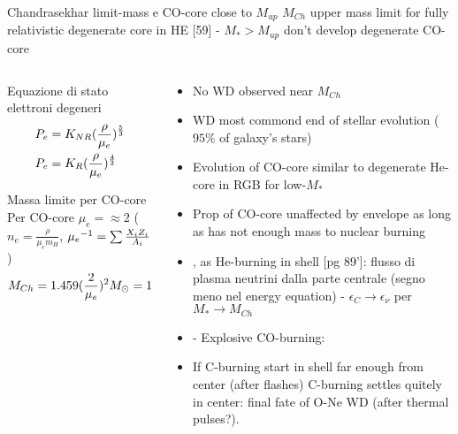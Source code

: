 \begin{frame}{Chandrasekhar limit-mass e CO-core close to $M_{up}$}
$M_{Ch}$ upper mass limit for fully relativistic degenerate core in HE [59] - $M_*>M_{up}$ don't develop degenerate CO-core
\begin{columns}[T]
\begin{column}{0.4\textwidth}
\begin{block}{Equazione di stato elettroni degeneri}
\begin{align*}
&P_e=K_{NR}(\frac{\rho}{\mu_e})^{\frac{5}{3}}\\
&P_e=K_R(\frac{\rho}{\mu_e})^{\frac{4}{3}}
\end{align*}
\end{block}
\begin{block}{Massa limite per CO-core}
Per CO-core $\mu_e=\approx2$ ($n_e=\frac{\rho}{\mu_em_H}$, ${\mu_e}^{-1}=\sum\frac{X_iZ_i}{A_i}$)
\begin{align*}
&M_{Ch}=1.459(\frac{2}{\mu_e})^2M_{\odot}=1.46M_{\odot}
\end{align*}
\end{block}
\end{column}
\begin{column}{0.45\textwidth}
\begin{itemize}
\item No WD observed near $M_{Ch}$
\item WD most commond end of stellar evolution ($95\%$ of galaxy's stars)
\item Evolution of CO-core similar to degenerate He-core in RGB for low-$M_*$
\item Prop of CO-core unaffected by envelope as long as has not enough mass to nuclear burning
\item {},  as He-burning in shell [pg 89']: flusso di plasma neutrini dalla parte centrale \xaumenta{\epsilon_{\nu}}(segno meno nel energy equation) - $\epsilon_C\to\epsilon_{\nu}$ per $M_*\to M_{Ch}$
\item {}  - Explosive CO-burning: 

\item If C-burning start in shell far enough from center (after flashes) C-burning settles quitely in center: final fate of O-Ne WD (after thermal pulses?).
\end{itemize}
\end{column}
\end{columns}
\end{frame}

